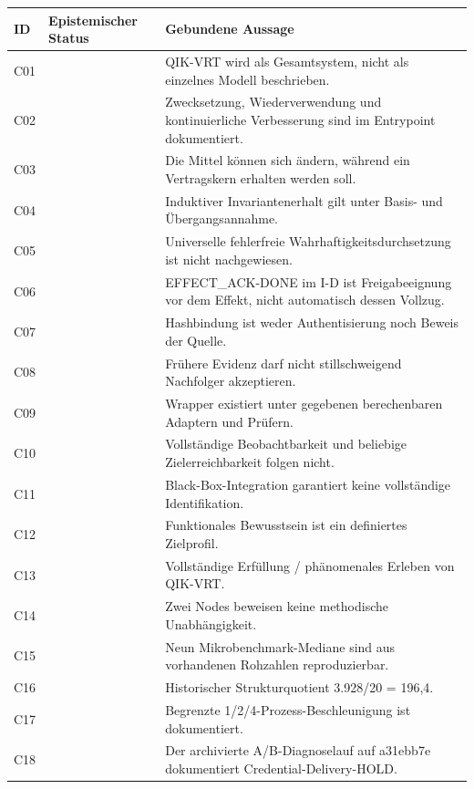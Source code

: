 {\tighttable
\begin{longtable}{@{}L{8mm}L{45mm}L{111mm}@{}}
\toprule ID & Epistemischer Status & Gebundene Aussage \\ \midrule
\endhead
C01 &  & QIK-VRT wird als Gesamtsystem, nicht als einzelnes Modell beschrieben. \\
C02 &  & Zwecksetzung, Wiederverwendung und kontinuierliche Verbesserung sind im Entrypoint dokumentiert. \\
C03 &  & Die Mittel können sich ändern, während ein Vertragskern erhalten werden soll. \\
C04 &  & Induktiver Invariantenerhalt gilt unter Basis- und Übergangsannahme. \\
C05 &  & Universelle fehlerfreie Wahrhaftigkeitsdurchsetzung ist nicht nachgewiesen. \\
C06 &  & EFFECT\_ACK-DONE im I-D ist Freigabeeignung vor dem Effekt, nicht automatisch dessen Vollzug. \\
C07 &  & Hashbindung ist weder Authentisierung noch Beweis der Quelle. \\
C08 &  & Frühere Evidenz darf nicht stillschweigend Nachfolger akzeptieren. \\
C09 &  & Wrapper existiert unter gegebenen berechenbaren Adaptern und Prüfern. \\
C10 &  & Vollständige Beobachtbarkeit und beliebige Zielerreichbarkeit folgen nicht. \\
C11 &  & Black-Box-Integration garantiert keine vollständige Identifikation. \\
C12 &  & Funktionales Bewusstsein ist ein definiertes Zielprofil. \\
C13 &  & Vollständige Erfüllung / phänomenales Erleben von QIK-VRT. \\
C14 &  & Zwei Nodes beweisen keine methodische Unabhängigkeit. \\
C15 &  & Neun Mikrobenchmark-Mediane sind aus vorhandenen Rohzahlen reproduzierbar. \\
C16 &  & Historischer Strukturquotient 3.928/20 = 196,4. \\
C17 &  & Begrenzte 1/2/4-Prozess-Beschleunigung ist dokumentiert. \\
C18 &  & Der archivierte A/B-Diagnoselauf auf a31ebb7e dokumentiert Credential-Delivery-HOLD. \\

\end{longtable}}
